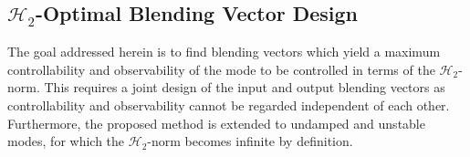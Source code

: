 \documentclass[aerospace,article,submit,moreauthors,pdftex,10pt,a4paper]{Definitions/mdpi}
\begin{document}
%
% 
\subsection{$\mathcal{H}_2$-Optimal Blending Vector Design}
\label{sec:contrObs}


The goal addressed herein is to find blending vectors which yield a maximum controllability and observability of the mode to be controlled in terms of the $\mathcal{H}_2$-norm.
This requires a joint design of the input and output blending vectors as controllability and observability cannot be regarded independent of each other.
Furthermore, the proposed method is extended to undamped and unstable modes, for which the $\mathcal{H}_2$-norm becomes infinite by definition.
\end{document}
